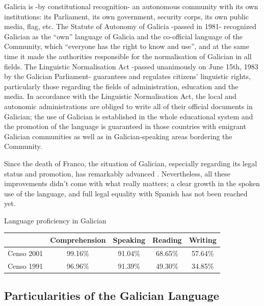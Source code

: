 \begin{multicols}{2}
\begin{itemize}
\begin{multicols}{2}
Galicia is -by constitutional recognition- an autonomous community with its own institutions: its Parliament, its own government, security corps, its own public media, flag, etc. The Statute of Autonomy of Galicia -passed in 1981- recognized Galician as the “own” language of Galicia and the co-official language of the Community, which “everyone has the right to know and use”, and at the same time it made the authorities responsible for the normalisation of Galician in all fields. The Linguistic Normalisation Act -passed unanimously on June 15th, 1983 by the Galician Parliament- guarantees and regulates citizens’ linguistic rights, particularly those regarding the fields of administration, education and the media. 
In accordance with the Linguistic Normalisation Act, the local and autonomic administrations are obliged to write all of their official documents in Galician; the use of Galician is established in the whole educational system and the promotion of the language is guaranteed in those countries with emigrant Galician communities as well as in Galician-speaking areas bordering the Community. 

Since the death of Franco, the situation of Galician, especially regarding its legal status and promotion, has remarkably advanced \cite{GAL-Nota7}. Nevertheless, all these improvements didn't come with what really matters; a clear growth in the spoken use of the language, and full legal equality with Spanish has not been reached yet.

 
Language proficiency in Galician\cite{GAL-Nota8}

\begin{tabular}{|c|c|c|c|c|}
\hline  & Comprehension & Speaking & Reading & Writing \\ 
\hline Censo 2001 & 99.16\% & 91.04\% & 68.65\% & 57.64\% \\ 
\hline Censo 1991 & 96.96\% & 91.39\% & 49.30\% & 34.85\% \\ 
\hline 
\end{tabular} 
  


\subsection{Particularities of the Galician Language}


\end{multicols}
\end{itemize}
\end{multicols}
